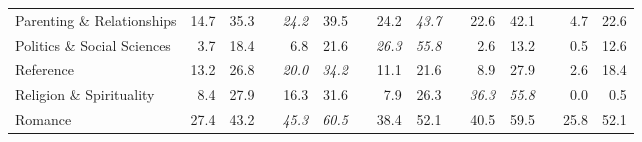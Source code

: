 \documentclass[12pt]{article}
\numberwithin{equation}{section}
\numberwithin{figure}{section}
\begin{document}
\begin{table}[]
{\begin{tabular}{lrrrrrrrrrrrrrr}
	Parenting \& Relationships     & 14.7                               & 35.3                               &                               & \textit{24.2}                      & 39.5                               &                               & 24.2                               & \textit{43.7}                      &                               & 22.6                               & 42.1                               &                               & 4.7                                & 22.6                               \\
	Politics \& Social Sciences    & 3.7                                & 18.4                               &                               & 6.8                                & 21.6                               &                               & \textit{26.3}                      & \textit{55.8}                      &                               & 2.6                                & 13.2                               &                               & 0.5                                & 12.6                               \\
	Reference                      & 13.2                               & 26.8                               &                               & \textit{20.0}                      & \textit{34.2}                      &                               & 11.1                               & 21.6                               &                               & 8.9                                & 27.9                               &                               & 2.6                                & 18.4                               \\
	Religion \& Spirituality       & 8.4                                & 27.9                               &                               & 16.3                               & 31.6                               &                               & 7.9                                & 26.3                               &                               & \textit{36.3}                      & \textit{55.8}                      &                               & 0.0                                & 0.5                                \\
	Romance                        & 27.4                               & 43.2                               &                               & \textit{45.3}                      & \textit{60.5}                      &                               & 38.4                               & 52.1                               &                               & 40.5                               & 59.5                               &                               & 25.8                               & 52.1                               \\

\end{tabular}}
\end{table}
\end{document}
